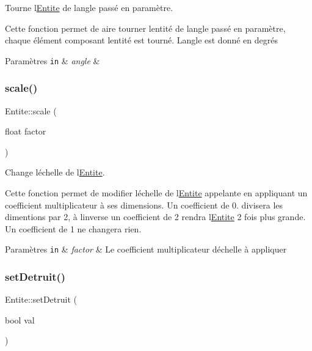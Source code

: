 Tourne l\textquotesingle{}\hyperlink{class_entite}{Entite} de l\textquotesingle{}angle passé en paramètre. 

Cette fonction permet de aire tourner l\textquotesingle{}entité de l\textquotesingle{}angle passé en paramètre, chaque élément composant l\textquotesingle{}entité est tourné. L\textquotesingle{}angle est donné en degrés 
\begin{DoxyParams}[1]{Paramètres}
\mbox{\tt in}  & {\em angle} & \\
\hline
\end{DoxyParams}
\mbox{\label{class_entite_a770f6c53856606c4de768bb942299659}} 
\subsubsection{\texorpdfstring{scale()}{scale()}}
{\footnotesize\ttfamily Entite\+::scale (\begin{DoxyParamCaption}\item[{float}]{factor }\end{DoxyParamCaption})}



Change l\textquotesingle{}échelle de l\textquotesingle{}\hyperlink{class_entite}{Entite}. 

Cette fonction permet de modifier l\textquotesingle{}échelle de l\textquotesingle{}\hyperlink{class_entite}{Entite} appelante en appliquant un coefficient multiplicateur à ses dimensions. Un coefficient de 0. divisera les dimentions par 2, à l\textquotesingle{}inverse un coefficient de 2 rendra l\textquotesingle{}\hyperlink{class_entite}{Entite} 2 fois plus grande. Un coefficient de 1 ne changera rien. 
\begin{DoxyParams}[1]{Paramètres}
\mbox{\tt in}  & {\em factor} & Le coefficient multiplicateur d\textquotesingle{}échelle à appliquer \\
\hline
\end{DoxyParams}
\mbox{\label{class_entite_a4b0ce40a2427f44978728dbae9560fee}} 
\subsubsection{\texorpdfstring{set\+Detruit()}{setDetruit()}}
{\footnotesize\ttfamily Entite\+::set\+Detruit (\begin{DoxyParamCaption}\item[{bool}]{val }\end{DoxyParamCaption})}



